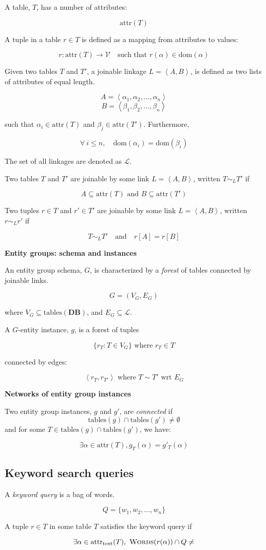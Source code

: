 \documentclass[conference]{IEEEtran}
\newcommand{\DB}{\mathbf{DB}}
\newcommand{\attr}{\mathrm{attr}}
\newcommand{\textattr}{\mathrm{attr}_\mathrm{text}}
\newcommand{\Val}{\mathcal{V}}
\newcommand{\dom}{\mathrm{dom}}
\newcommand{\Tables}{\mathrm{tables}}
\newcommand{\Words}{\textsc{Words}}
\begin{document}
A table, $T$, has a number of attributes:

$$ \attr(T) $$

A tuple in a table $r\in T$ is defined as a mapping from attributes to values:

$$ r:\attr(T)\to\Val\quad \mbox{such that } r(\alpha)\in\dom(\alpha) $$

Given two tables $T$ and $T'$, a joinable linkage $L=\left<A,B\right>$, is defined as two lists of attributes of equal length.

$$A = \left<\alpha_1, \alpha_2, \dots, \alpha_n\right>$$
$$B = \left<\beta_1, \beta_2, \dots, \beta_n\right>$$

such that $\alpha_i\in\attr(T)$ and $\beta_j\in\attr(T')$.  Furthermore,

$$ \forall\ i\leq n,\quad \dom(\alpha_i) = \dom(\beta_i)$$

The set of all linkages are denoted as $\mathcal{L}$.

Two tables $T$ and $T'$ are joinable by some link $L=\left<A,B\right>$, written $T\sim_L T'$ if

$$A\subseteq\attr(T)\mbox{ and } B\subseteq\attr(T')$$

Two tuples $r\in T$ and $r'\in T'$ are joinable by some link $L=\left<A,B\right>$,
written $r\sim_L r'$ if

$$ T\sim_L T'\quad\mbox{and}\quad r[A] = r[B] $$

\textbf{Entity groups: schema and instances}

An {entity group schema}, $G$, is characterized by a {\em forest} of tables connected by joinable links.

$$G = (V_G, E_G)$$

where $V_G \subseteq \Tables(\DB)$, and $E_G\subseteq\mathcal{L}$.

A $G$-entity instance, $g$, is a forest of tuples 

$$\{r_T : T\in V_G\} \mbox{ where } r_T\in T$$

connected by edges:

$$\left<r_T, r_{T'}\right> \mbox{ where } T\sim T' \mbox{ wrt } E_G$$

{\bf Networks of entity group instances}

Two entity group instances, $g$ and $g'$, are {\em connected} if 
$$\Tables(g)\cap\Tables(g')\not=\emptyset$$
and for some $T\in\Tables(g)\cap\Tables(g')$, we have:

$$\exists\alpha\in\attr(T), g_T(\alpha) = g'_T(\alpha)$$

\subsection{Keyword search queries}

A {\em keyword query} is a bag of words.

$$ Q = \{w_1, w_2, \dots, w_n\} $$

A tuple $r\in T$ in some table $T$ satisfies the keyword query if

$$\exists \alpha\in\textattr(T),\ \Words(r(\alpha))\cap Q\not=\empty$$



\end{document}
